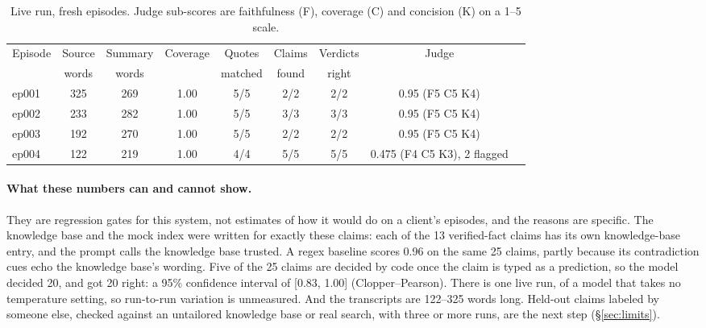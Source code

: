 \documentclass[11pt]{article}
\begin{document}
\begin{table}[t]
\centering\small
\caption{Live run, fresh episodes. Judge sub-scores are faithfulness (F), coverage (C) and concision (K) on a 1--5 scale.}\label{tab:episodes}
\setlength{\tabcolsep}{4.5pt}
\begin{tabular}{@{}lcccccccl@{}}
\toprule
Episode & Source & Summary & Coverage & Quotes & Claims & Verdicts & Judge \\
 & words & words & & matched & found & right & \\
\midrule
ep001 & 325 & 269 & 1.00 & 5/5 & 2/2 & 2/2 & 0.95 (F5 C5 K4) \\
ep002 & 233 & 282 & 1.00 & 5/5 & 3/3 & 3/3 & 0.95 (F5 C5 K4) \\
ep003 & 192 & 270 & 1.00 & 5/5 & 2/2 & 2/2 & 0.95 (F5 C5 K4) \\
ep004 & 122 & 219 & 1.00 & 4/4 & 5/5 & 5/5 & 0.475 (F4 C5 K3), 2 flagged \\
\bottomrule
\end{tabular}
\end{table}

\paragraph{What these numbers can and cannot show.} They are regression gates for this system, not estimates of how it would do on a client's episodes, and the reasons are specific. The knowledge base and the mock index were written for exactly these claims: each of the 13 verified-fact claims has its own knowledge-base entry, and the prompt calls the knowledge base trusted. A regex baseline scores 0.96 on the same 25 claims, partly because its contradiction cues echo the knowledge base's wording. Five of the 25 claims are decided by code once the claim is typed as a prediction, so the model decided 20, and got 20 right: a 95\% confidence interval of [0.83, 1.00] (Clopper--Pearson). There is one live run, of a model that takes no temperature setting, so run-to-run variation is unmeasured. And the transcripts are 122--325 words long. Held-out claims labeled by someone else, checked against an untailored knowledge base or real search, with three or more runs, are the next step (\S\ref{sec:limits}).
\end{document}
